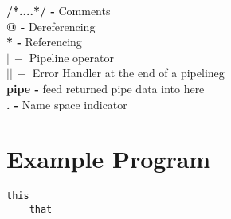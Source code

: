 \documentclass[11pt]{article}
\begin{document}
\qquad \textbf{/*....*/ - } Comments \\ 

\qquad \textbf{@ - } Dereferencing \\ 

\qquad \textbf{* -} Referencing\\ 
 
\qquad $\mathbf{\vert \ -}$ Pipeline operator\\ 

\qquad $\mathbf{\vert \vert \ -}$  Error Handler at the end of a pipelineg\\

\qquad \textbf{pipe -} feed returned pipe data into here\\ 

\qquad \textbf{. -} Name space indicator\\



\section{Example Program}
\begin{lstlisting}
this
	that
\end{lstlisting}

\end{document}
